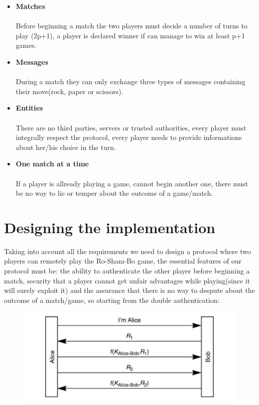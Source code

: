\documentclass{article}
\begin{document}
\begin{itemize}
 \item \textbf{Matches}\\\\
 	Before beginning a match the two players must decide a number of turns 	to play (2p+1), a player is declared winner if can manage to win at least p+1 games.
	
 	\item \textbf{Messages}\\\\
	During a match they can only exchange three types of messages containing their move(rock, paper or scissors).
	
	\item \textbf{Entities}\\\\
	There are no third parties, servers or trusted authorities, every player must integrally respect the protocol, every player needs to provide informations about her/his choice in the turn. 
	
	\item \textbf{One match at a time}\\\\
	If a player is allready playing a game, cannot begin another one, there must be no way to lie or temper about the outcome of a game/match.

	\end{itemize}
	
\section{Designing the implementation}
Taking into account all the requirements we need to design a protocol where two players can remotely play the Ro-Sham-Bo game, the essential features of our protocol must be: the ability to authenticate the other player before beginning a match, security that a player cannot get unfair advantages while playing(since it will surely exploit it) and the assurance that there is no way to despute about the outcome of a match/game, so starting from the double authentication:

	\begin{figure}[h]
		\includegraphics[width=1\textwidth ]{images/doubleAuth.png}
		\centering
	\end{figure}
	
\end{document}
